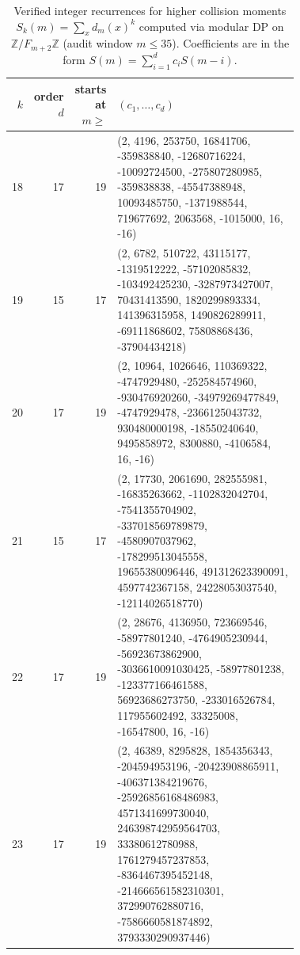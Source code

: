 \begin{table}[H]
\centering
\scriptsize
\setlength{\tabcolsep}{4pt}
\caption{Verified integer recurrences for higher collision moments $S_k(m)=\sum_x d_m(x)^k$ computed via modular DP on $\mathbb{Z}/F_{m+2}\mathbb{Z}$ (audit window $m\le 35$). Coefficients are in the form $S(m)=\sum_{i=1}^d c_i S(m-i)$.}
\label{tab:fold_collision_moment_recursions_18_23}
\begin{tabular}{r r r p{0.72\linewidth}}
\toprule
$k$ & order $d$ & starts at $m\ge$ & $(c_1,\dots,c_d)$\\
\midrule
18 & 17 & 19 & (2, 4196, 253750, 16841706, -359838840, -12680716224, -10092724500, -275807280985, -359838838, -45547388948, 10093485750, -1371988544, 719677692, 2063568, -1015000, 16, -16)\\
19 & 15 & 17 & (2, 6782, 510722, 43115177, -1319512222, -57102085832, -103492425230, -3287973427007, 70431413590, 1820299893334, 141396315958, 1490826289911, -69111868602, 75808868436, -37904434218)\\
20 & 17 & 19 & (2, 10964, 1026646, 110369322, -4747929480, -252584574960, -930476920260, -34979269477849, -4747929478, -2366125043732, 930480000198, -18550240640, 9495858972, 8300880, -4106584, 16, -16)\\
21 & 15 & 17 & (2, 17730, 2061690, 282555981, -16835263662, -1102832042704, -7541355704902, -337018569789879, -4580907037962, -178299513045558, 19655380096446, 491312623390091, 4597742367158, 24228053037540, -12114026518770)\\
22 & 17 & 19 & (2, 28676, 4136950, 723669546, -58977801240, -4764905230944, -56923673862900, -3036610091030425, -58977801238, -123377166461588, 56923686273750, -233016526784, 117955602492, 33325008, -16547800, 16, -16)\\
23 & 17 & 19 & (2, 46389, 8295828, 1854356343, -204594953196, -20423908865911, -406371384219676, -25926856168486983, 4571341699730040, 246398742959564703, 33380612780988, 1761279457237853, -8364467395452148, -214666561582310301, 372990762880716, -7586660581874892, 3793330290937446)\\
\bottomrule
\end{tabular}
\end{table}
